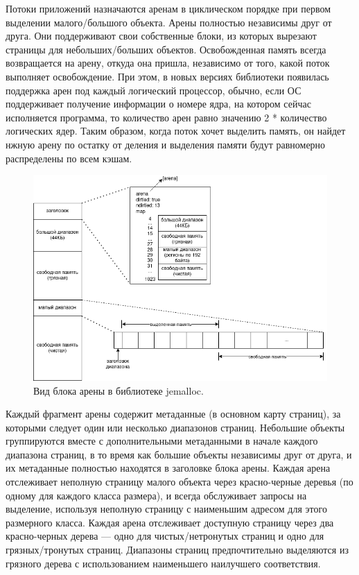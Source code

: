 Потоки приложений назначаются аренам в циклическом порядке при первом выделении малого/большого объекта. Арены полностью независимы друг от друга. Они поддерживают свои собственные блоки, из которых вырезают страницы для небольших/больших объектов. Освобожденная память всегда возвращается на арену, откуда она пришла, независимо от того, какой поток выполняет освобождение. При этом, в новых версиях библиотеки появилась поддержка арен под каждый логический процессор, обычно, если ОС поддерживает получение информации о номере ядра, на котором сейчас исполняется программа, то количество арен равно значению 2 * количество логических ядер. Таким образом, когда поток хочет выделить память, он найдет нжную арену по остатку от деления и выделения памяти будут равномерно распределены по всем кэшам.

\begin{figure}[!h]
	\begin{center}
		\includegraphics[scale=0.6]{images/jemalloc-arena-chunk.png}
		\caption{Вид блока арены в библиотеке jemalloc.}
		\label{jemalloc-arena-chunk}
	\end{center}
\end{figure}

Каждый фрагмент арены содержит метаданные (в основном карту страниц), за которыми следует один или несколько диапазонов страниц. Небольшие объекты группируются вместе с дополнительными метаданными в начале каждого диапазона страниц, в то время как большие объекты независимы друг от друга, и их метаданные полностью находятся в заголовке блока арены. Каждая арена отслеживает неполную страницу малого объекта через красно-черные деревья (по одному для каждого класса размера), и всегда обслуживает запросы на выделение, используя неполную страницу с наименьшим адресом для этого размерного класса. Каждая арена отслеживает доступную страницу через два красно-черных дерева — одно для чистых/нетронутых страниц и одно для грязных/тронутых страниц. Диапазоны страниц предпочтительно выделяются из грязного дерева с использованием наименьшего наилучшего соответствия.

